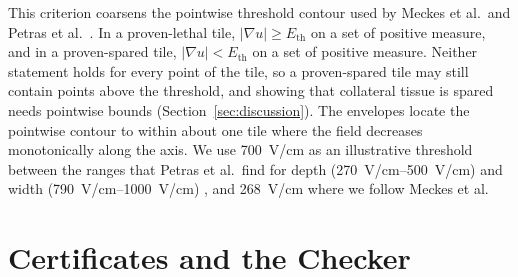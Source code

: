 \documentclass[11pt]{article}
\begin{document}
This criterion coarsens the pointwise threshold contour used by Meckes et al.\
and Petras et al.\ \cite{meckes2022,petras2025}. In a proven-lethal tile,
$|\nabla u|\ge E_\mathrm{th}$ on a set of positive measure, and in a proven-spared
tile, $|\nabla u|<E_\mathrm{th}$ on a set of positive measure. Neither statement
holds for every point of the tile, so a proven-spared tile may still contain
points above the threshold, and showing that collateral tissue is spared needs
pointwise bounds (Section~\ref{sec:discussion}). The envelopes locate the
pointwise contour to within about one tile where the field decreases
monotonically along the axis. We use \SI{700}{V/cm} as an
illustrative threshold between the ranges that Petras et al.\ find for depth
(\SIrange{270}{500}{V/cm}) and width (\SIrange{790}{1000}{V/cm}) \cite{petras2025}, and \SI{268}{V/cm} where we
follow Meckes et al.

\section{Certificates and the Checker}\label{sec:cert}
\end{document}
